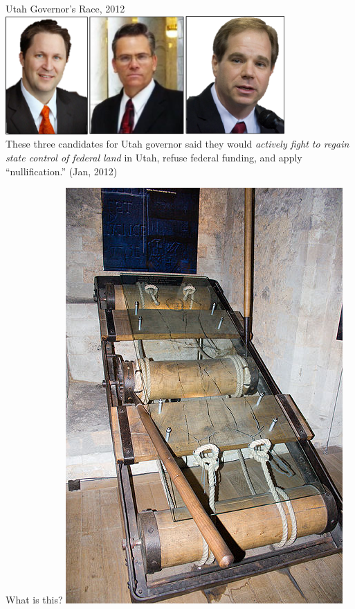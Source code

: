 \begin{frame}{Utah Governor's Race, 2012}
    \centering
    \includegraphics[width=0.8\textwidth,height=.5\textwidth,keepaspectratio=true]{img/gov.png} \\
    { \Large These three candidates for Utah governor said they would \emph{actively fight to regain state control of federal land} in Utah, refuse federal funding, and apply ``nullification.'' (Jan, 2012) \\ }
\end{frame}

\begin{frame}{What is this?}
    \centering
    \includegraphics[height=0.95\textheight]{img/rack.png} \\
\end{frame}

